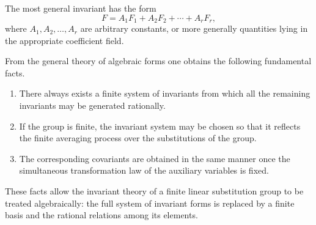 \documentclass[11pt]{article}
\begin{document}
The most general invariant has the form
\begin{equation}
F=A_1F_1+A_2F_2+\cdots+A_rF_r,
\end{equation}
where \(A_1,A_2,\ldots,A_r\) are arbitrary constants, or more generally quantities lying in the appropriate coefficient field.

From the general theory of algebraic forms one obtains the following fundamental facts.

\begin{enumerate}[label=\Roman*.]
\item There always exists a finite system of invariants from which all the remaining invariants may be generated rationally.
\item If the group is finite, the invariant system may be chosen so that it reflects the finite averaging process over the substitutions of the group.
\item The corresponding covariants are obtained in the same manner once the simultaneous transformation law of the auxiliary variables is fixed.
\end{enumerate}

These facts allow the invariant theory of a finite linear substitution group to be treated algebraically: the full system of invariant forms is replaced by a finite basis and the rational relations among its elements.
\end{document}
